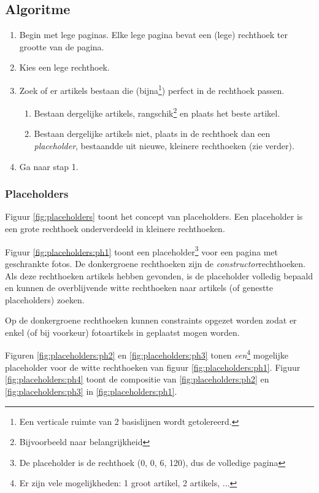 \documentclass[a4paper,12pt]{report}
\begin{document}
		\subsection{Algoritme}
\begin{enumerate}
	\item[] Begin met lege paginas. Elke lege pagina bevat een (lege) rechthoek ter grootte van de pagina.
	\item Kies een lege rechthoek.
	\item Zoek of er artikels bestaan die (bijna\footnote{Een verticale ruimte van 2 basislijnen wordt getolereerd.}) perfect in de rechthoek passen.
	\begin{enumerate}
		\item Bestaan dergelijke artikels, rangschik\footnote{Bijvoorbeeld naar belangrijkheid} en plaats het beste artikel.
		\item Bestaan dergelijke artikels niet, plaats in de rechthoek dan een \textit{placeholder}, bestaandde uit nieuwe, kleinere rechthoeken (zie verder).
	\end{enumerate}
	\item Ga naar stap 1.
\end{enumerate}

			\subsubsection{Placeholders}
Figuur \ref{fig:placeholders} toont het concept van placeholders. Een placeholder is een grote rechthoek onderverdeeld in kleinere rechthoeken.

Figuur \ref{fig:placeholders:ph1} toont een placeholder\footnote{De placeholder is de rechthoek (0, 0, 6, 120), dus de volledige pagina} voor een pagina met geschrankte fotos. De donkergroene rechthoeken zijn de \textit{constructor}rechthoeken. Als deze rechthoeken artikels hebben gevonden, is de placeholder volledig bepaald en kunnen de overblijvende witte rechthoeken naar artikels (of genestte placeholders) zoeken.

Op de donkergroene rechthoeken kunnen constraints opgezet worden zodat er enkel (of bij voorkeur) fotoartikels in geplaatst mogen worden. 

Figuren \ref{fig:placeholders:ph2} en \ref{fig:placeholders:ph3} tonen \textit{een}\footnote{Er zijn vele mogelijkheden: 1 groot artikel, 2 artikels, ...} mogelijke placeholder voor de witte rechthoeken van figuur \ref{fig:placeholders:ph1}. Figuur \ref{fig:placeholders:ph4} toont de compositie van \ref{fig:placeholders:ph2} en \ref{fig:placeholders:ph3} in \ref{fig:placeholders:ph1}.
\end{document}
